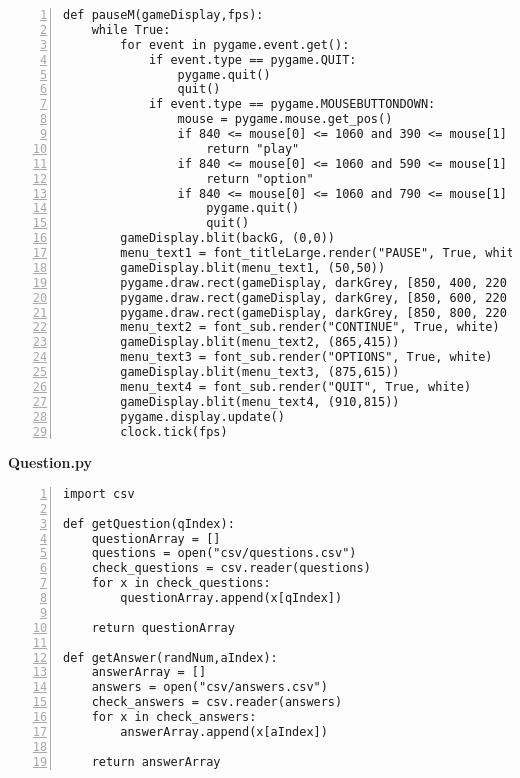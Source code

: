 \documentclass[12pt]{report}
\begin{document}
\begin{Verbatim}[numbers=left, frame=single]
def pauseM(gameDisplay,fps):
    while True:
        for event in pygame.event.get():
            if event.type == pygame.QUIT:
                pygame.quit()
                quit()
            if event.type == pygame.MOUSEBUTTONDOWN:
                mouse = pygame.mouse.get_pos()
                if 840 <= mouse[0] <= 1060 and 390 <= mouse[1] <= 470:
                    return "play"
                if 840 <= mouse[0] <= 1060 and 590 <= mouse[1] <= 670:
                    return "option"
                if 840 <= mouse[0] <= 1060 and 790 <= mouse[1] <= 870:
                    pygame.quit()
                    quit()
        gameDisplay.blit(backG, (0,0))  
        menu_text1 = font_titleLarge.render("PAUSE", True, white)
        gameDisplay.blit(menu_text1, (50,50))
        pygame.draw.rect(gameDisplay, darkGrey, [850, 400, 220 , 60])
        pygame.draw.rect(gameDisplay, darkGrey, [850, 600, 220 , 60])
        pygame.draw.rect(gameDisplay, darkGrey, [850, 800, 220 , 60])
        menu_text2 = font_sub.render("CONTINUE", True, white)
        gameDisplay.blit(menu_text2, (865,415))
        menu_text3 = font_sub.render("OPTIONS", True, white)
        gameDisplay.blit(menu_text3, (875,615))
        menu_text4 = font_sub.render("QUIT", True, white)
        gameDisplay.blit(menu_text4, (910,815))
        pygame.display.update()                                                                     
        clock.tick(fps)
\end{Verbatim}
\normalsize

\textbf{Question.py}
\tiny
\begin{Verbatim}[numbers=left, frame=single]
import csv

def getQuestion(qIndex):
    questionArray = []
    questions = open("csv/questions.csv")
    check_questions = csv.reader(questions)
    for x in check_questions:
        questionArray.append(x[qIndex])

    return questionArray

def getAnswer(randNum,aIndex):
    answerArray = []
    answers = open("csv/answers.csv")
    check_answers = csv.reader(answers)
    for x in check_answers:
        answerArray.append(x[aIndex])

    return answerArray
\end{Verbatim}
\normalsize
\end{document}
